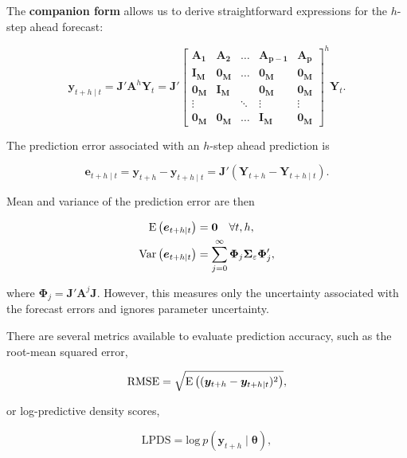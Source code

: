 The \textbf{companion form} allows us to derive straightforward expressions for the $h$-step ahead forecast:

\begin{equation}
	\bm{y}_{t+h\mid t} = \bm{J}'\bm{A}^h\bm{Y}_t = \bm{J}'
	\begin{bmatrix}
\bm{A}_{\bm{1}} & \bm{A}_{\bm{2}} & \ldots & \bm{A}_{\bm{p}-\bm{1}} & \bm{A}_{\bm{p}} \\
\bm{I}_{\bm{M}} & \bm{0}_{\bm{M}} & \ldots & \bm{0}_{\bm{M}} & \bm{0}_{\bm{M}} \\
\bm{0}_{\bm{M}} & \bm{I}_{\bm{M}} & & \bm{0}_{\bm{M}} & \bm{0}_{\bm{M}} \\
\vdots & & \ddots & \vdots & \vdots \\
\bm{0}_{\bm{M}} & \bm{0}_{\bm{M}} & \ldots & \bm{I}_{\bm{M}} & \bm{0}_{\bm{M}}
\end{bmatrix}^h\bm{Y}_t.
\end{equation}

The prediction error associated with an $h$-step ahead prediction is

\begin{equation}
	\bm{e}_{t+h\mid t} = \bm{y}_{t+h}-\bm{y}_{t+h\mid t} = \bm{J}'(\bm{Y}_{t+h}-\bm{Y}_{t+h\mid t}).
\end{equation}

Mean and variance of the prediction error are then

\begin{align*}
	\mathrm{E}\left({\bm{e}_{t+h\mid t}}\right) &= \bm{0} \quad \forall t,h, \\
	\mathrm{Var}\left({\bm{e}_{t+h\mid t}}\right) &= \sum^\infty_{j=0}\bm{\Phi}_j\bm{\Sigma}_\varepsilon\bm{\Phi}_j',
\end{align*}

where $\bm{\Phi}_j = \bm{J}'\bm{A}^j\bm{J}$. However, this measures only the uncertainty associated with the forecast errors and ignores parameter uncertainty.

There are several metrics available to evaluate prediction accuracy, such as the root-mean squared error,

\begin{equation}
	\mathrm{RMSE} = \sqrt{\mathrm{E}\left({(\bm{y}_{t+h}-\bm{y}_{t+h\mid t})^2}\right)},
\end{equation}

or log-predictive density scores,

\begin{equation}
	\mathrm{LPDS} = \mathrm{log}\:p(\bm{y}_{t+h}\mid \bm{\theta}),
\end{equation}

